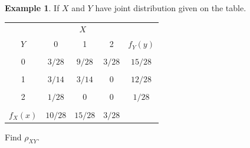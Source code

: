 \documentclass[12pt,a4paper]{report}
\theoremstyle{definition}
\newtheorem{example}[thm]{Example}
\theoremstyle{plain}
\theoremstyle{definition}
\begin{document}
\begin{example}
If $X$ and $Y$ have joint distribution given on the table.
\begin{table}[H]
\centering
\begin{tabular}{c|ccc|c}
&\multicolumn{3}{c}{$X$}\\
$Y$ & 0 & 1 & 2 & $f_Y(y)$\\
\hline
&&&&\\
0 & $3/28$ & $9/28$ & $3/28$ & $15/28$\\
&&&&\\
1 & $3/14$ & $3/14$ & 0 & $12/28$\\
&&&&\\
2 & $1/28$ & 0 & 0 & $1/28$\\
\hline
&&&&\\
$f_X(x)$ & $10/28$ & $15/28$ & $3/28$ & \\
\end{tabular}
\end{table}
Find $\rho_{XY}$.
\end{example}
\end{document}
